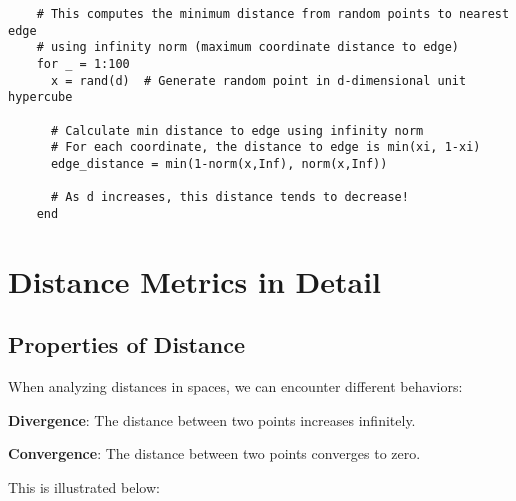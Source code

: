 \documentclass[12pt]{article}
\begin{document}
\begin{tcolorbox}[width=\textwidth, left=-6mm, sharp corners, boxrule=0pt, title=\textbf{ Experiment: Distance to nearest edge}]
  \begin{verbatim}
    # This computes the minimum distance from random points to nearest edge
    # using infinity norm (maximum coordinate distance to edge)
    for _ = 1:100
      x = rand(d)  # Generate random point in d-dimensional unit hypercube
      
      # Calculate min distance to edge using infinity norm
      # For each coordinate, the distance to edge is min(xi, 1-xi)
      edge_distance = min(1-norm(x,Inf), norm(x,Inf))
      
      # As d increases, this distance tends to decrease!
    end
  \end{verbatim}
\end{tcolorbox}

\section{Distance Metrics in Detail}
\subsection{Properties of Distance}
When analyzing distances in spaces, we can encounter different behaviors:

\textbf{Divergence}: The distance between two points increases infinitely.

\textbf{Convergence}: The distance between two points converges to zero.

This is illustrated below:

\begin{center}
\end{center}
\end{document}
